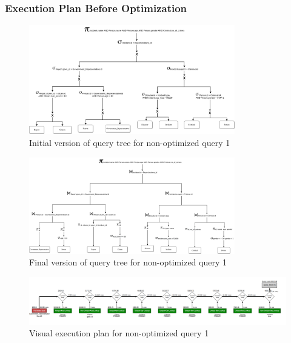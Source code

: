 \subsubsection{Execution Plan Before Optimization}
\begin{figure}[H]
    \centering
    \includegraphics[width=0.8\textwidth]{images/query_trees/query1-non-optimized-initial-version.png}
    \caption{Initial version of query tree for non-optimized query 1}
\end{figure}
\begin{figure}[H]
    \centering
    \includegraphics[width=0.8\textwidth]{images/query_trees/query1-non-optimized-final-version.png}
    \caption{Final version of query tree for non-optimized query 1}
\end{figure}
\begin{figure}[H]
    \centering
    \includegraphics[width=\textwidth]{images/execution_plans/q1-1-old.png}
    \caption{Visual execution plan for non-optimized query 1}
\end{figure}

